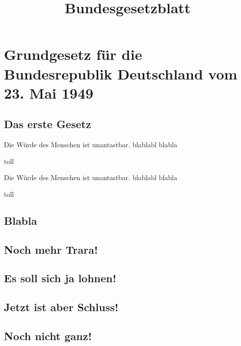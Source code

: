 \documentclass{sasbase}
\begin{document}
\title{Bundesgesetzblatt}

\mytitle


\section{Grundgesetz für die Bundesrepublik Deutschland vom 23. Mai 1949}

\lipsum[1]

\subsection{Das erste Gesetz}

\squarestyle
\begin{article}[Hallo]
    \item Die Würde des Menschen ist unantastbar. blablabl
        blabla
    \item toll
\end{article}

\parensstyle
\begin{article}[Hallo]
    \item Die Würde des Menschen ist unantastbar. blablabl
        blabla
    \item toll
\end{article}

\lipsum[2]

\subsection{Blabla}

\lipsum[3]

\subsection{Noch mehr Trara!}

\lipsum[4]

\subsection{Es soll sich ja lohnen!}

\lipsum[5]

\subsection{Jetzt ist aber Schluss!}

\lipsum[6]

\subsection{Noch nicht ganz!}

\lipsum[7]
\end{document}
